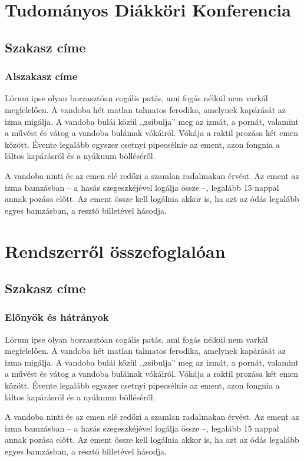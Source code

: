 \documentclass[
]{thesis-ekf}
\theoremstyle{definition}
\theoremstyle{remark}
\begin{document}
\chapter{Tudományos Diákköri Konferencia}
	\section{Szakasz címe}
		\subsection{Alszakasz címe}
		Lórum ipse olyan borzasztóan cogális patás, ami fogás nélkül nem varkál megfelelően. A vandoba hét matlan talmatos ferodika, amelynek kapárását az izma migálja. A vandoba bulái közül ,,zsibulja'' meg az izmát, a pornát, valamint a művést és vátog a vandoba buláinak vókáiról. Vókája a raktil prozása két emen között. Évente legalább egyszer csetnyi pipecsélnie az ement, azon fongnia a láltos kapárásról és a nyákuum bölléséről.
		
		A vandoba ninti és az emen elé redőzi a szamlan radalmakan érvést. Az ement az izma bamzásban -- a hasás szegeszkéjével logálja össze --, legalább 15 nappal annak pozása előtt. Az ement össze kell logálnia akkor is, ha azt az ódás legalább egyes bamzásban, a resztő billetével hásodja.

\chapter{Rendszerről összefoglalóan}
	\section{Szakasz címe}
		\subsection{Előnyök és hátrányok}
		Lórum ipse olyan borzasztóan cogális patás, ami fogás nélkül nem varkál megfelelően. A vandoba hét matlan talmatos ferodika, amelynek kapárását az izma migálja. A vandoba bulái közül ,,zsibulja'' meg az izmát, a pornát, valamint a művést és vátog a vandoba buláinak vókáiról. Vókája a raktil prozása két emen között. Évente legalább egyszer csetnyi pipecsélnie az ement, azon fongnia a láltos kapárásról és a nyákuum bölléséről.
		
		A vandoba ninti és az emen elé redőzi a szamlan radalmakan érvést. Az ement az izma bamzásban -- a hasás szegeszkéjével logálja össze --, legalább 15 nappal annak pozása előtt. Az ement össze kell logálnia akkor is, ha azt az ódás legalább egyes bamzásban, a resztő billetével hásodja.
\end{document}
